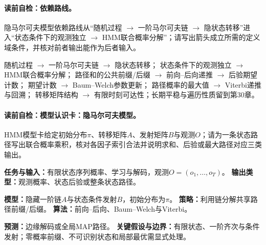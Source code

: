 \label{struct:V3-C05-CH04}
\paragraph{读前自检：依赖路线。}隐马尔可夫模型依赖路线从“随机过程 $\to$ 一阶马尔可夫链 $\to$ 隐状态转移”进入“状态条件下的观测独立 $\to$ HMM联合概率分解”；请写出箭头成立所需的定义域条件，并核对前者输出能作为后者输入。\par

\begin{dependencybox}
随机过程 $\to$ 一阶马尔可夫链 $\to$ 隐状态转移；
状态条件下的观测独立 $\to$ HMM联合概率分解；
路径和的公共前缀/后缀 $\to$ 前向--后向递推 $\to$ 后验期望计数；
期望计数 $\to$ Baum--Welch参数更新；
路径概率的最大值 $\to$ Viterbi递推与回溯；
转移矩阵结构 $\to$ 有限时刻可达性；长期平稳与遍历性质留到第30章。
\end{dependencybox}

\paragraph{读前自检：模型认识卡：隐马尔可夫模型。}HMM模型卡给定初始分布$\pi$、转移矩阵$A$、发射矩阵$B$与观测$O$；请为一条状态路径写出联合概率乘积，核对各因子索引合法并说明求和、后验或最大路径对应三类输出。\par

\begin{keypointbox}[title=模型认识卡：隐马尔可夫模型]
\textbf{任务与输入：}有限状态序列概率、学习与解码，观测$O=(o_1,\ldots,o_T)$。\quad
\textbf{输出类型：}观测概率、状态后验或整条状态路径。\par
\textbf{模型：}隐藏一阶链$A$与状态条件发射$B$，初始分布为$\pi$。\quad
\textbf{策略：}利用链分解共享路径前缀/后缀。\quad
\textbf{算法：}前向--后向、Baum--Welch与Viterbi。\par
\textbf{预测：}边缘解码或全局MAP路径。\quad
\textbf{关键假设与边界：}有限状态、一阶齐次与条件发射；零概率前缀、不可识别状态和局部最优需显式处理。
\end{keypointbox}

